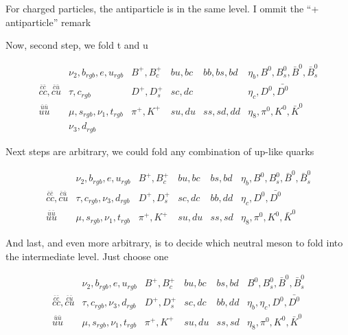 \documentclass{article}
\begin{document}
For charged particles, the antiparticle is in the same level. I ommit the ``+ antiparticle'' remark

Now, second step, we fold t and u

$$
\begin{array}{lllllll} 
&\nu_2, b_{rgb}, e, u_{rgb}& 
      B^+,B_c^+ & 
      {bu}, {bc}
      & {bb}, {bs}, {bd} & 
      \eta_b, B^0, B^0_s,  \bar B^0, \bar B^0_s \\ 
\stackrel{\bar c\bar c}{cc},\stackrel{\bar c\bar u}{cu}&
\tau, c_{rgb} &
       D^+, D_s^+&
       sc,dc  &
       & 
       \eta_c, D^0, \bar {D^0}\\ 
\stackrel{\bar u\bar u}{uu}&
\mu, s_{rgb} , \nu_1, t_{rgb}&
         \pi^+, K^+& 
         su, du&
         ss, sd, dd &
         \eta_8, \pi^0, K^0, \bar K^0 \\ 
&\nu_3,  d_{rgb} 
\end{array}
$$

Next steps are arbitrary, we could fold any combination of up-like quarks

$$
\begin{array}{lllllll} 
&\nu_2, b_{rgb}, e, u_{rgb}& 
      B^+,B_c^+ & 
      {bu}, {bc}
      &  {bs}, {bd} & 
      \eta_b, B^0, B^0_s,  \bar B^0, \bar B^0_s \\ 
\stackrel{\bar c\bar c}{cc},\stackrel{\bar c\bar u}{cu}&
\tau, c_{rgb} , \nu_3,  d_{rgb}&
       D^+, D_s^+&
       sc,dc  & 
       bb,dd &
       \eta_c, D^0, \bar {D^0}\\ 
\stackrel{\bar u\bar u}{uu}&
\mu, s_{rgb} , \nu_1, t_{rgb}&
         \pi^+, K^+& 
         su, du&
         ss, sd&
         \eta_8, \pi^0, K^0, \bar K^0 
\end{array}
$$

And last, and even more arbitrary, is to decide which neutral meson
to fold into the intermediate level. Just choose one

$$
\begin{array}{lllllll} 
&\nu_2, b_{rgb}, e, u_{rgb}& 
      B^+,B_c^+ & 
      {bu}, {bc}
      &  {bs}, {bd} & 
       B^0, B^0_s,  \bar B^0, \bar B^0_s \\ 
\stackrel{\bar c\bar c}{cc},\stackrel{\bar c\bar u}{cu}&
\tau, c_{rgb} , \nu_3,  d_{rgb}&
       D^+, D_s^+&
       sc,dc  & 
       bb,dd &
       \eta_b, \eta_c, D^0, \bar {D^0}\\ 
\stackrel{\bar u\bar u}{uu}&
\mu, s_{rgb} , \nu_1, t_{rgb}&
         \pi^+, K^+& 
         su, du&
         ss, sd&
         \eta_8, \pi^0, K^0, \bar K^0 
\end{array}
$$
\end{document}
